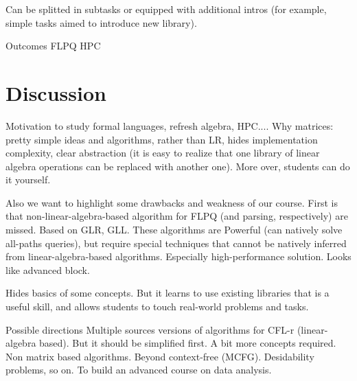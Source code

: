 \documentclass[sigconf]{acmart}
\begin{document}
Can be splitted in subtasks or equipped with additional intros (for example, simple tasks aimed to introduce new library). 

Outcomes 
FLPQ
HPC

\section{Discussion}

Motivation to study formal languages, refresh algebra, HPC....
Why matrices: pretty simple ideas and algorithms, rather than LR, hides implementation complexity, clear abstraction (it is easy to realize that one library of linear algebra operations can be replaced with another one). More over, students can do it yourself.

Also we want to highlight some drawbacks and weakness of our course.
First is that non-linear-algebra-based algorithm for FLPQ (and parsing, respectively) are missed. Based on GLR, GLL. These algorithms are Powerful (can natively solve all-paths queries), but require special techniques that cannot be natively inferred from linear-algebra-based algorithms. Especially high-performance solution. Looks like advanced block. 

Hides basics of some concepts. But it learns to use existing libraries that is a useful skill, and allows students to touch real-world problems and tasks.

Possible directions 
Multiple sources versions of algorithms for CFL-r (linear-algebra based). But it should be simplified first. A bit more concepts required.
Non matrix based algorithms.
Beyond context-free (MCFG). Desidability problems, so on.
To build an advanced course on data analysis. 



\end{document}
